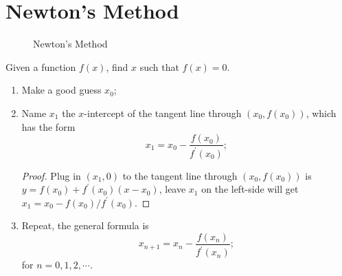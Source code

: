 \section{Newton's Method}
\begin{figure}[H]
  \centering
  \caption{Newton's Method}
\end{figure}
Given a function $f(x)$, find $x$ such that $f(x)=0$.
\begin{enumerate}
\item Make a good guess $x_0$;
\item Name $x_1$ the $x$-intercept of the tangent line through $(x_0,f(x_0))$, which has the form
  \[\boxed{x_1=x_0-\frac{f(x_0)}{f^\prime(x_0)};}\]
  \begin{proof}
    Plug in $(x_1, 0)$ to the tangent line through $(x_0, f(x_0))$ is $y=f(x_0)+f^\prime(x_0)(x-x_0)$, leave $x_1$ on the left-side will get $x_1=x_0-f(x_0)/f^\prime(x_0)$.
  \end{proof}
\item Repeat, the general formula is
  \[\boxed{x_{n+1}=x_n-\frac{f(x_n)}{f^\prime(x_n)};}\]
  for $n=0,1,2,\cdots$.
\end{enumerate}
